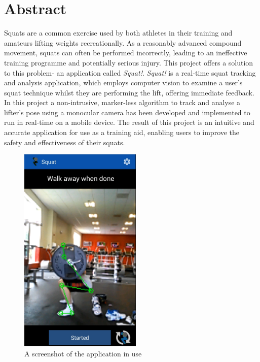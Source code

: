 \section*{Abstract}

Squats are a common exercise used by both athletes in their training and amateurs lifting weights recreationally. As a reasonably advanced compound movement, squats can often be performed incorrectly, leading to an ineffective training programme and potentially serious injury. This project offers a solution to this problem- an application called \emph{Squat!}. \emph{Squat!} is a real-time squat tracking and analysis application, which employs computer vision to examine a user's squat technique whilst they are performing the lift, offering immediate feedback. In this project a non-intrusive, marker-less algorithm to track and analyse a lifter's pose using a monocular camera has been developed and implemented to run in real-time on a mobile device. The result of this project is an intuitive and accurate application for use as a training aid, enabling users to improve the safety and effectiveness of their squats.

\begin{figure}[H]
    \centering
	\includegraphics[height=10cm]{application/images/belowparallel}
\caption{A screenshot of the application in use}
\label{fig:preview}
\end{figure}